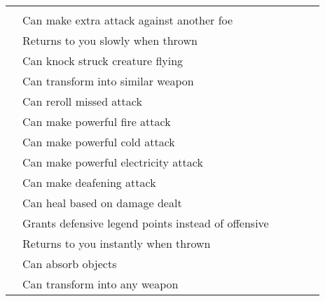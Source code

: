         \begin{longtabuwrapper}
            \begin{longtabu}{l X l l l l}
                 &  &  &  &  \\
                 & Can make extra attack against another foe &  &  \\
                 & Returns to you slowly when thrown &  &  \\
                 & Can knock struck creature flying &  &  \\
                 & Can transform into similar weapon &  &  \\
                 & Can reroll missed attack &  &  \\
                 & Can make powerful fire attack &  &  \\
                 & Can make powerful cold attack &  &  \\
                 & Can make powerful electricity attack &  &  \\
                 & Can make deafening attack &  &  \\
                 & Can heal based on damage dealt &  &  \\
                 & Grants defensive legend points instead of offensive &  &  \\
                 & Returns to you instantly when thrown &  &  \\
                 & Can absorb objects &  &  \\
                 & Can transform into any weapon &  &  \\

\end{longtabu}
\end{longtabuwrapper}
